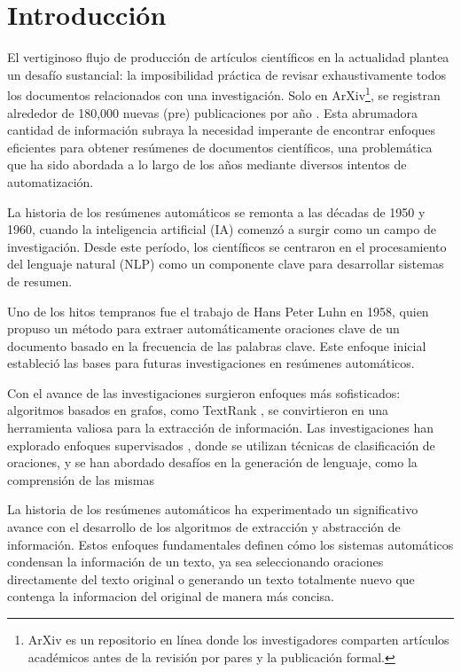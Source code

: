 \chapter*{Introducción}\label{chapter:introduction}

    El vertiginoso flujo de producción de artículos científicos en la actualidad plantea un desafío sustancial: la imposibilidad práctica de revisar exhaustivamente todos los documentos relacionados con una investigación. Solo en ArXiv\footnote{ArXiv es un repositorio en línea donde los investigadores comparten artículos académicos antes de la revisión por pares y la publicación formal.}, se registran alrededor de 180,000 nuevas (pre) publicaciones por año \cite{arxivstats}. Esta abrumadora cantidad de información subraya la necesidad imperante de encontrar enfoques eficientes para obtener resúmenes de documentos científicos, una problemática que ha sido abordada a lo largo de los años mediante diversos intentos de automatización.

    La historia de los resúmenes automáticos se remonta a las décadas de 1950 y 1960, cuando la inteligencia artificial (IA) comenzó a surgir como un campo de investigación. Desde este período, los científicos se centraron en el procesamiento del lenguaje natural (NLP) como un componente clave para desarrollar sistemas de resumen.

    Uno de los hitos tempranos fue el trabajo de Hans Peter Luhn en 1958\cite{luhun1958}, quien propuso un método para extraer automáticamente oraciones clave de un documento basado en la frecuencia de las palabras clave. Este enfoque inicial estableció las bases para futuras investigaciones en resúmenes automáticos.

    Con el avance de las investigaciones surgieron enfoques más sofisticados: algoritmos basados en grafos, como TextRank \cite{mihalcea2004textrank}, se convirtieron en una herramienta valiosa para la extracción de información. Las investigaciones han explorado enfoques supervisados \cite{collins-etal-2017-supervised}, donde se utilizan técnicas de clasificación de oraciones, y se han abordado desafíos en la generación de lenguaje, como la comprensión de las mismas \cite{knight2000statistics}

    La historia de los resúmenes automáticos ha experimentado un significativo avance con el desarrollo de los algoritmos de extracción y abstracción de información. Estos enfoques fundamentales definen cómo los sistemas automáticos condensan la información de un texto, ya sea seleccionando oraciones directamente del texto original o generando un texto totalmente nuevo que contenga la informacion del original de manera más concisa.

